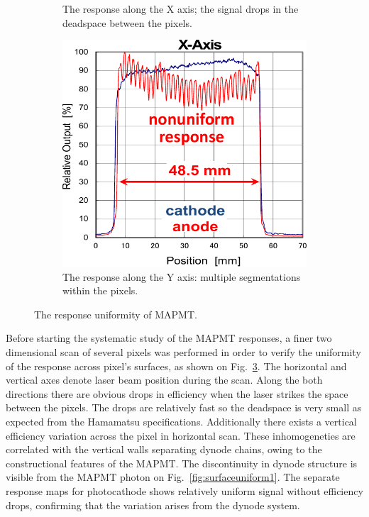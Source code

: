 \begin{figure}[b]
\begin{subfigure}{0.3\linewidth}
		\caption{The response along the X axis; the signal drops in the deadspace between the pixels.}
		\label{fig:surfaceuniform2}
	\end{subfigure}
	\quad
	\begin{subfigure}{0.3\linewidth}
		\includegraphics[width=\textwidth]{surfaceuniform2.pdf}
		\caption{The response along the Y axis: multiple segmentations within the pixels.}
		\label{fig:surfaceuniform3}
	\end{subfigure}
	\caption{The response uniformity of MAPMT.}
	\label{fig:surfaceuniform}
\end{figure}


Before starting the systematic study of the MAPMT responses, a finer two dimensional scan of several pixels was performed in order to verify the uniformity of the response across pixel's surfaces, as shown on Fig.~\ref{fig:surfaceuniform}.
The horizontal and vertical axes denote laser beam position during the scan.
Along the both directions there are obvious drops in efficiency when the laser strikes the space between the pixels.
The drops are relatively fast so the deadspace is very small as expected from the Hamamatsu specifications.
Additionally there exists a vertical efficiency variation across the pixel in horizontal scan.
These inhomogeneties are correlated with the vertical walls separating dynode chains, owing to the constructional features of the MAPMT. The discontinuity in dynode structure is visible from the MAPMT photon on Fig.~\ref{fig:surfaceuniform1}.
The separate response maps for photocathode shows relatively uniform signal without efficiency drops, confirming that the variation arises from the dynode system.
